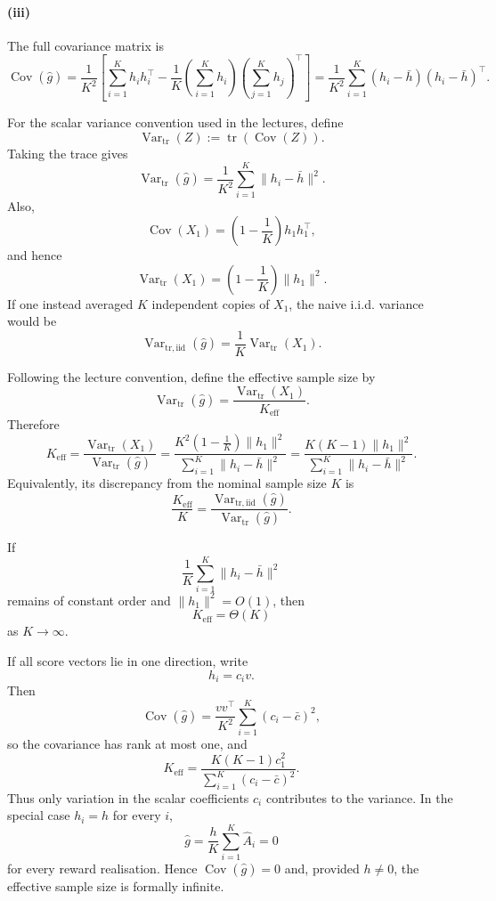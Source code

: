 \documentclass[11pt]{article}
\begin{document}
\paragraph{(iii)}
The full covariance matrix is
\[
\operatorname{Cov}(\hat g)
=
\frac{1}{K^2}
\left[
\sum_{i=1}^K h_i h_i^\top
-
\frac{1}{K}
\left(\sum_{i=1}^K h_i\right)
\left(\sum_{j=1}^K h_j\right)^\top
\right]
=
\frac{1}{K^2}
\sum_{i=1}^K
(h_i-\bar h)(h_i-\bar h)^\top .
\]

For the scalar variance convention used in the lectures, define
\[
\operatorname{Var}_{\mathrm{tr}}(Z)
:=
\operatorname{tr}\!\left(\operatorname{Cov}(Z)\right).
\]
Taking the trace gives
\[
\operatorname{Var}_{\mathrm{tr}}(\hat g)
=
\frac{1}{K^2}
\sum_{i=1}^K
\|h_i-\bar h\|^2.
\]
Also,
\[
\operatorname{Cov}(X_1)
=
\left(1-\frac{1}{K}\right)h_1h_1^\top,
\]
and hence
\[
\operatorname{Var}_{\mathrm{tr}}(X_1)
=
\left(1-\frac{1}{K}\right)\|h_1\|^2.
\]
If one instead averaged $K$ independent copies of $X_1$, the naive i.i.d.
variance would be
\[
\operatorname{Var}_{\mathrm{tr,iid}}(\hat g)
=
\frac{1}{K}\operatorname{Var}_{\mathrm{tr}}(X_1).
\]

Following the lecture convention, define the effective sample size by
\[
\operatorname{Var}_{\mathrm{tr}}(\hat g)
=
\frac{\operatorname{Var}_{\mathrm{tr}}(X_1)}
{K_{\mathrm{eff}}}.
\]
Therefore
\[
K_{\mathrm{eff}}
=
\frac{
\operatorname{Var}_{\mathrm{tr}}(X_1)
}{
\operatorname{Var}_{\mathrm{tr}}(\hat g)
}
=
\frac{
K^2\left(1-\frac{1}{K}\right)\|h_1\|^2
}{
\sum_{i=1}^K\|h_i-\bar h\|^2
}
=
\frac{
K(K-1)\|h_1\|^2
}{
\sum_{i=1}^K\|h_i-\bar h\|^2
}.
\]
Equivalently, its discrepancy from the nominal sample size $K$ is
\[
\frac{K_{\mathrm{eff}}}{K}
=
\frac{
\operatorname{Var}_{\mathrm{tr,iid}}(\hat g)
}{
\operatorname{Var}_{\mathrm{tr}}(\hat g)
}.
\]

If
\[
\frac{1}{K}\sum_{i=1}^K\|h_i-\bar h\|^2
\]
remains of constant order and $\|h_1\|^2=O(1)$, then
\[
K_{\mathrm{eff}}=\Theta(K)
\]
as $K\to\infty$.

If all score vectors lie in one direction, write
\[
h_i=c_i v.
\]
Then
\[
\operatorname{Cov}(\hat g)
=
\frac{vv^\top}{K^2}
\sum_{i=1}^K(c_i-\bar c)^2,
\]
so the covariance has rank at most one, and
\[
K_{\mathrm{eff}}
=
\frac{
K(K-1)c_1^2
}{
\sum_{i=1}^K(c_i-\bar c)^2
}.
\]
Thus only variation in the scalar coefficients $c_i$ contributes to the
variance. In the special case $h_i=h$ for every $i$,
\[
\hat g
=
\frac{h}{K}\sum_{i=1}^K\hat A_i
=0
\]
for every reward realisation. Hence
$\operatorname{Cov}(\hat g)=0$ and, provided $h\neq0$, the effective sample size
is formally infinite.
\end{document}
